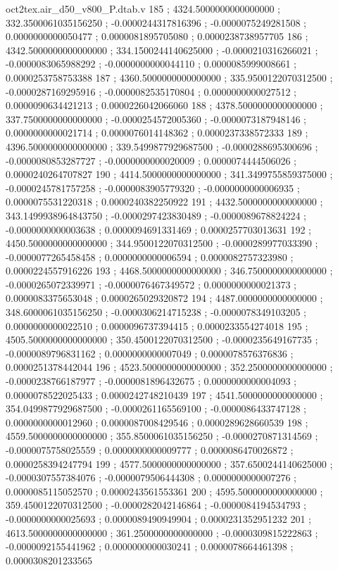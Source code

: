\begin{filecontents}[overwrite]{oct2tex.air_d50_v800_P.dtab.v}
185 ; 4324.5000000000000000 ; 332.3500061035156250 ; -0.0000244317816396 ; -0.0000075249281508 ; 0.0000000000050477 ; 0.0000081895705080 ; 0.0000238738957705
186 ; 4342.5000000000000000 ; 334.1500244140625000 ; -0.0000210316266021 ; -0.0000083065988292 ; -0.0000000000044110 ; 0.0000085999008661 ; 0.0000253758753388
187 ; 4360.5000000000000000 ; 335.9500122070312500 ; -0.0000287169295916 ; -0.0000082535170804 ; 0.0000000000027512 ; 0.0000090634421213 ; 0.0000226042066060
188 ; 4378.5000000000000000 ; 337.7500000000000000 ; -0.0000254572005360 ; -0.0000073187948146 ; 0.0000000000021714 ; 0.0000076014148362 ; 0.0000237338572333
189 ; 4396.5000000000000000 ; 339.5499877929687500 ; -0.0000288695300696 ; -0.0000080853287727 ; -0.0000000000020009 ; 0.0000074444506026 ; 0.0000240264707827
190 ; 4414.5000000000000000 ; 341.3499755859375000 ; -0.0000245781757258 ; -0.0000083905779320 ; -0.0000000000006935 ; 0.0000075531220318 ; 0.0000240382250922
191 ; 4432.5000000000000000 ; 343.1499938964843750 ; -0.0000297423830489 ; -0.0000089678824224 ; -0.0000000000003638 ; 0.0000094691331469 ; 0.0000257703013631
192 ; 4450.5000000000000000 ; 344.9500122070312500 ; -0.0000289977033390 ; -0.0000077265458458 ; 0.0000000000006594 ; 0.0000082757323980 ; 0.0000224557916226
193 ; 4468.5000000000000000 ; 346.7500000000000000 ; -0.0000265072339971 ; -0.0000076467349572 ; 0.0000000000021373 ; 0.0000083375653048 ; 0.0000265029320872
194 ; 4487.0000000000000000 ; 348.6000061035156250 ; -0.0000306214715238 ; -0.0000078349103205 ; 0.0000000000022510 ; 0.0000096737394415 ; 0.0000233554274018
195 ; 4505.5000000000000000 ; 350.4500122070312500 ; -0.0000235649167735 ; -0.0000089796831162 ; 0.0000000000007049 ; 0.0000078576376836 ; 0.0000251378442044
196 ; 4523.5000000000000000 ; 352.2500000000000000 ; -0.0000238766187977 ; -0.0000081896432675 ; 0.0000000000004093 ; 0.0000078522025433 ; 0.0000242748210439
197 ; 4541.5000000000000000 ; 354.0499877929687500 ; -0.0000261165569100 ; -0.0000086433747128 ; 0.0000000000012960 ; 0.0000087008429546 ; 0.0000289628660539
198 ; 4559.5000000000000000 ; 355.8500061035156250 ; -0.0000270871314569 ; -0.0000075758025559 ; 0.0000000000009777 ; 0.0000086470026872 ; 0.0000258394247794
199 ; 4577.5000000000000000 ; 357.6500244140625000 ; -0.0000307557384076 ; -0.0000079506444308 ; 0.0000000000007276 ; 0.0000085115052570 ; 0.0000243561553361
200 ; 4595.5000000000000000 ; 359.4500122070312500 ; -0.0000282042146864 ; -0.0000084194534793 ; -0.0000000000025693 ; 0.0000089490949904 ; 0.0000231352951232
201 ; 4613.5000000000000000 ; 361.2500000000000000 ; -0.0000309815222863 ; -0.0000092155441962 ; 0.0000000000030241 ; 0.0000078664461398 ; 0.0000308201233565

\end{filecontents}
